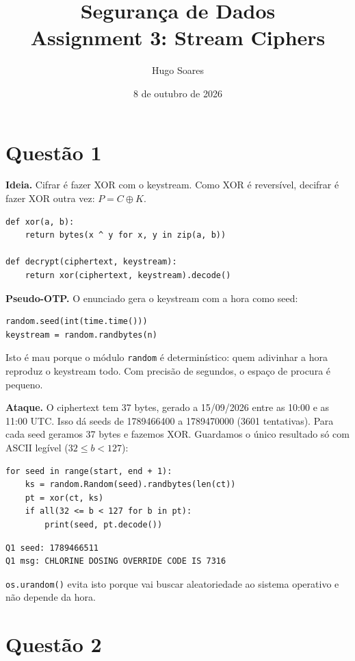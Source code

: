 \documentclass[11pt,a4paper]{article}
\title{Segurança de Dados\\\large Assignment 3: Stream Ciphers}
\author{Hugo Soares}
\date{8 de outubro de 2026}
\begin{document}
\maketitle

\section*{Questão 1}

\textbf{Ideia.} Cifrar é fazer XOR com o keystream. Como XOR é reversível,
decifrar é fazer XOR outra vez: $P = C \oplus K$.

\begin{verbatim}
def xor(a, b):
    return bytes(x ^ y for x, y in zip(a, b))

def decrypt(ciphertext, keystream):
    return xor(ciphertext, keystream).decode()
\end{verbatim}

\textbf{Pseudo-OTP.} O enunciado gera o keystream com a hora como seed:

\begin{verbatim}
random.seed(int(time.time()))
keystream = random.randbytes(n)
\end{verbatim}

Isto é mau porque o módulo \texttt{random} é determinístico: quem adivinhar
a hora reproduz o keystream todo. Com precisão de segundos, o espaço de
procura é pequeno.

\textbf{Ataque.} O ciphertext tem 37 bytes, gerado a 15/09/2026 entre as
10:00 e as 11:00 UTC. Isso dá seeds de 1789466400 a 1789470000 (3601
tentativas). Para cada seed geramos 37 bytes e fazemos XOR. Guardamos o
único resultado só com ASCII legível ($32 \le b < 127$):

\begin{verbatim}
for seed in range(start, end + 1):
    ks = random.Random(seed).randbytes(len(ct))
    pt = xor(ct, ks)
    if all(32 <= b < 127 for b in pt):
        print(seed, pt.decode())
\end{verbatim}

\begin{verbatim}
Q1 seed: 1789466511
Q1 msg: CHLORINE DOSING OVERRIDE CODE IS 7316
\end{verbatim}

\texttt{os.urandom()} evita isto porque vai buscar aleatoriedade ao sistema
operativo e não depende da hora.

\section*{Questão 2}
\end{document}
